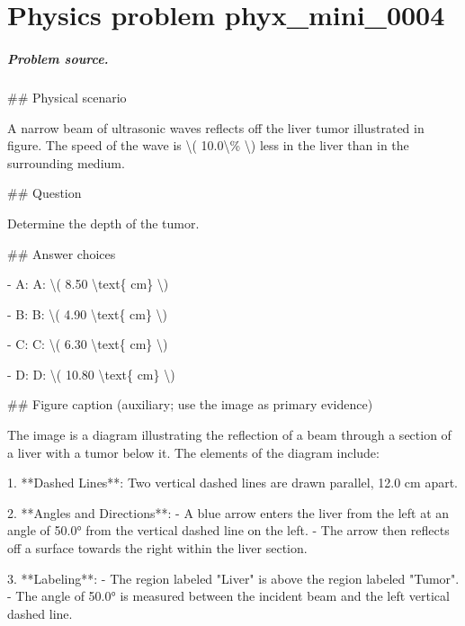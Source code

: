 
\chapter{Physics problem phyx\_mini\_0004}
\label{ch:PhyXMiniProblems_problem_phyx_mini_0004}

\paragraph{Problem source.}
\#\# Physical scenario

A narrow beam of ultrasonic waves reflects off the liver tumor illustrated in figure. The speed of the wave is \textbackslash{}( 10.0\textbackslash{}\% \textbackslash{}) less in the liver than in the surrounding medium.

\#\# Question

Determine the depth of the tumor.

\#\# Answer choices

- A: A: \textbackslash{}( 8.50 \textbackslash{}text\{ cm\} \textbackslash{})

- B: B: \textbackslash{}( 4.90 \textbackslash{}text\{ cm\} \textbackslash{})

- C: C: \textbackslash{}( 6.30 \textbackslash{}text\{ cm\} \textbackslash{})

- D: D: \textbackslash{}( 10.80 \textbackslash{}text\{ cm\} \textbackslash{})

\#\# Figure caption (auxiliary; use the image as primary evidence)

The image is a diagram illustrating the reflection of a beam through a section of a liver with a tumor below it. The elements of the diagram include:

1. **Dashed Lines**: Two vertical dashed lines are drawn parallel, 12.0 cm apart.

2. **Angles and Directions**: 
   - A blue arrow enters the liver from the left at an angle of 50.0° from the vertical dashed line on the left.
   - The arrow then reflects off a surface towards the right within the liver section.

3. **Labeling**:
   - The region labeled "Liver" is above the region labeled "Tumor".
   - The angle of 50.0° is measured between the incident beam and the left vertical dashed line.
   

